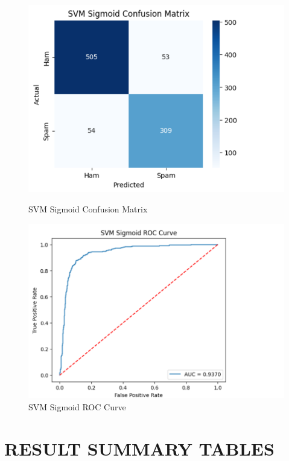 \documentclass[12pt]{article}
\begin{document}
\begin{figure}[H]
\centering
\begin{minipage}{0.45\textwidth}
\centering
\includegraphics[width=\linewidth]{26.png}
\caption{SVM Sigmoid Confusion Matrix}
\end{minipage}
\hfill
\begin{minipage}{0.45\textwidth}
\centering
\includegraphics[width=\linewidth]{27.png}
\caption{SVM Sigmoid ROC Curve}
\end{minipage}
\end{figure}

\section*{RESULT SUMMARY TABLES}
\end{document}
